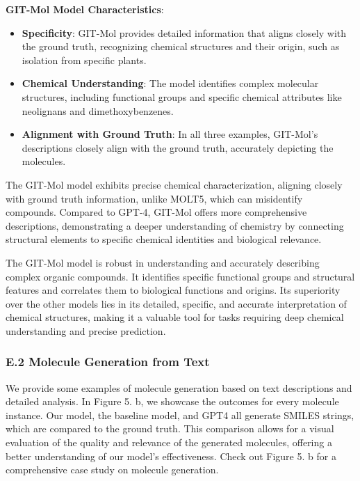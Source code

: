 \documentclass{article}
\begin{document}
\textbf{GIT-Mol Model Characteristics}:
\begin{itemize}
\item\textbf{Specificity}: GIT-Mol provides detailed information that aligns closely with the ground truth, recognizing chemical structures and their origin, such as isolation from specific plants.
\item\textbf{Chemical Understanding}: The model identifies complex molecular structures, including functional groups and specific chemical attributes like neolignans and dimethoxybenzenes.
\item\textbf{Alignment with Ground Truth}: In all three examples, GIT-Mol's descriptions closely align with the ground truth, accurately depicting the molecules.
\end{itemize}

The GIT-Mol model exhibits precise chemical characterization, aligning closely with ground truth information, unlike MOLT5, which can misidentify compounds. Compared to GPT-4, GIT-Mol offers more comprehensive descriptions, demonstrating a deeper understanding of chemistry by connecting structural elements to specific chemical identities and biological relevance.

The GIT-Mol model is robust in understanding and accurately describing complex organic compounds. It identifies specific functional groups and structural features and correlates them to biological functions and origins. Its superiority over the other models lies in its detailed, specific, and accurate interpretation of chemical structures, making it a valuable tool for tasks requiring deep chemical understanding and precise prediction.

\subsubsection*{E.2 Molecule Generation from Text}
We provide some examples of molecule generation based on text descriptions and detailed analysis. In Figure 5. b, we showcase the outcomes for every molecule instance. Our model, the baseline model, and GPT4 all generate SMILES strings, which are compared to the ground truth. This comparison allows for a visual evaluation of the quality and relevance of the generated molecules, offering a better understanding of our model's effectiveness. Check out Figure 5. b for a comprehensive case study on molecule generation.
\end{document}
